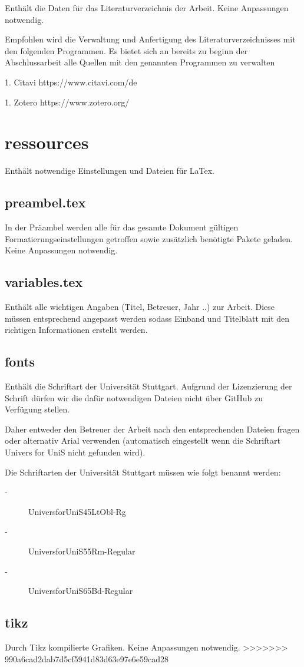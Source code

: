 Enthält die Daten für das Literaturverzeichnis der Arbeit. Keine Anpassungen notwendig.

Empfohlen wird die Verwaltung und Anfertigung des Literaturverzeichnisses mit den folgenden Programmen. Es bietet sich an bereits zu beginn der Abschlussarbeit alle Quellen mit den genannten Programmen zu verwalten

1. Citavi https://www.citavi.com/de

1. Zotero https://www.zotero.org/

\newpage

\section*{ressources}

Enthält notwendige Einstellungen und Dateien für LaTex.

\subsection*{preambel.tex}

In der Präambel werden alle für das gesamte Dokument gültigen Formatierungseinstellungen getroffen sowie zusätzlich benötigte Pakete geladen. Keine Anpassungen notwendig.

\subsection*{variables.tex}
\label{section:_E_ressources_variables}

Enthält alle wichtigen Angaben (Titel, Betreuer, Jahr ..) zur Arbeit. Diese müssen entsprechend angepasst werden sodass Einband und Titelblatt mit den richtigen Informationen erstellt werden.

\subsection*{fonts}
Enthält die Schriftart der Universität Stuttgart. Aufgrund der Lizenzierung der Schrift dürfen wir die dafür notwendigen Dateien nicht über GitHub zu Verfügung stellen. 

Daher entweder den Betreuer der Arbeit nach den entsprechenden Dateien fragen oder alternativ Arial verwenden (automatisch eingestellt wenn die Schriftart Univers for UniS nicht gefunden wird).

Die Schriftarten der Universität Stuttgart müssen wie folgt benannt werden:

\begin{description}
	\item[-] UniversforUniS45LtObl-Rg
	\item[-] UniversforUniS55Rm-Regular
	\item[-] UniversforUniS65Bd-Regular
\end{description}

\subsection*{tikz}
Durch Tikz kompilierte Grafiken. Keine Anpassungen notwendig.
>>>>>>> 990a6cad2dab7d5cf5941d83d63e97e6e59cad28
